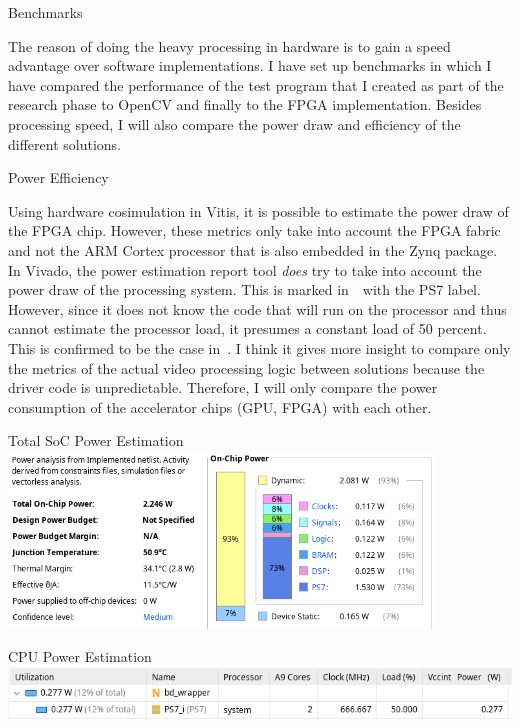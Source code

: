 \documentclass{matthijs}
\begin{document}
	\begin{hoofdstuk}{Benchmarks}

		The reason of doing the heavy processing in hardware is to gain a speed advantage over software implementations.
		I have set up benchmarks in which I have compared the performance of the test program that I created as part of the research phase to OpenCV and finally to the FPGA implementation.
		Besides processing speed, I will also compare the power draw and efficiency of the different solutions.

		\begin{paragraaf}{Power Efficiency}

			Using hardware cosimulation in Vitis, it is possible to estimate the power draw of the FPGA chip.
			However, these metrics only take into account the FPGA fabric and not the ARM Cortex processor that is also embedded in the Zynq package.
			In Vivado, the power estimation report tool \textit{does} try to take into account the power draw of the processing system.
			This is marked in~~with the PS7 label.
			However, since it does not know the code that will run on the processor and thus cannot estimate the processor load, it presumes a constant load of 50 percent.
			This is confirmed to be the case in~.
			I think it gives more insight to compare only the metrics of the actual video processing logic between solutions because the driver code is unpredictable.
			Therefore, I will only compare the power consumption of the accelerator chips (GPU, FPGA) with each other.

			\vspace{1.5ex}
			\begin{figuur}{Total SoC Power Estimation}
				\includegraphics[width=0.85\textwidth]{vivado-power.png}
			\end{figuur}
			\begin{figuur}{CPU Power Estimation}
				\includegraphics[width=\textwidth]{vivado-power-ps.png}
			\end{figuur}


\end{paragraaf}
\end{hoofdstuk}
\end{document}

